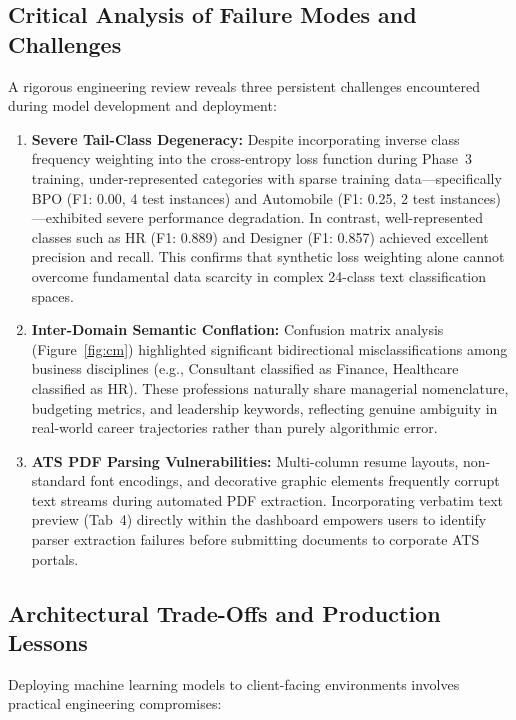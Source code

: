 \documentclass[11pt,a4paper]{article}
\begin{document}
\subsection{Critical Analysis of Failure Modes and Challenges}
\label{sec:failure_modes}

A rigorous engineering review reveals three persistent challenges encountered during
model development and deployment:

\begin{enumerate}
  \item \textbf{Severe Tail-Class Degeneracy:} Despite incorporating inverse class
  frequency weighting into the cross-entropy loss function during Phase~3 training,
  under-represented categories with sparse training data—specifically BPO
  (F1: 0.00, 4 test instances) and Automobile (F1: 0.25, 2 test instances)—exhibited
  severe performance degradation. In contrast, well-represented classes such as HR
  (F1: 0.889) and Designer (F1: 0.857) achieved excellent precision and recall.
  This confirms that synthetic loss weighting alone cannot overcome fundamental
  data scarcity in complex 24-class text classification spaces.
  \item \textbf{Inter-Domain Semantic Conflation:} Confusion matrix analysis
  (Figure~\ref{fig:cm}) highlighted significant bidirectional misclassifications
  among business disciplines (e.g., Consultant classified as Finance, Healthcare
  classified as HR). These professions naturally share managerial nomenclature,
  budgeting metrics, and leadership keywords, reflecting genuine ambiguity in
  real-world career trajectories rather than purely algorithmic error.
  \item \textbf{ATS PDF Parsing Vulnerabilities:} Multi-column resume layouts,
  non-standard font encodings, and decorative graphic elements frequently corrupt
  text streams during automated PDF extraction. Incorporating verbatim text preview
  (Tab~4) directly within the dashboard empowers users to identify parser extraction
  failures before submitting documents to corporate ATS portals.
\end{enumerate}

\subsection{Architectural Trade-Offs and Production Lessons}
\label{sec:tradeoffs}

Deploying machine learning models to client-facing environments involves practical
engineering compromises:
\end{document}

